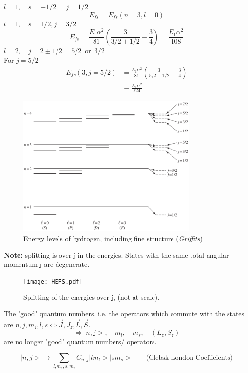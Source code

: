 \documentclass[12pt,fancychapters]{report}
\numberwithin{equation}{section}
\begin{document}
$l=1, \quad s= -1/2, \quad j=1/2$
\[
  E_{fs} = E_{fs}(n=3, l=0)
\]
$l=1,\quad s = 1/2, j = 3/2$
\[
  E_{fs}= \frac{E_1\alpha^2}{81}\left(\frac{3}{3/2+1/2} -\frac{3}{4} \right) =
  \frac{E_1\alpha^2}{108}
\]
$l=2,\quad j=2\pm 1/2 = 5/2\,\,\,\text{or}\,\,\,3/2$\\
For $j=5/2$
\begin{align*}
  E_{fs}(3, j=5/2) &= \frac{E_1\alpha^2}{81}\left(\frac{3}{5/2+1/2}-\frac{3}{4}\right)\\
                   &= \frac{E_1\alpha^2}{324}
\end{align*}
\begin{figure}[H]
  \centering
  \includegraphics[width=0.8\textwidth]{../Figures/FSE.png}
  \caption{Energy levels of hydrogen, including fine structure (\emph{Griffits})}
\end{figure}
\noindent
\textbf{Note:} splitting is over j in the energies. States with the same total angular momentum 
j are degenerate.
\begin{figure}[H]
  \centering
  \texttt{[image: HEFS.pdf]}
  \caption{Splitting of the energies over j, (not at scale).}
\end{figure}
\noindent
The "good" quantum numbers, i.e. the operators which commute with the states are 
$n, j, m_j, l,s \Longleftrightarrow  \vec{J},J_z, \vec{L}, \vec{S}$.
\[
\Rightarrow \big|n,j\big>, \quad m_l, \quad m_s , \quad (L_z, S_z)
\]
are no longer "good" quantum numbers/ operators.

\[
  \big|n,j\big> \longrightarrow \sum_{l,m_s,s,m_s} C_{n,j}\big|lm_l\big>\big|sm_s\big>\qquad
  \text{(Clebsk-London Coefficients)}
\]
\end{document}
